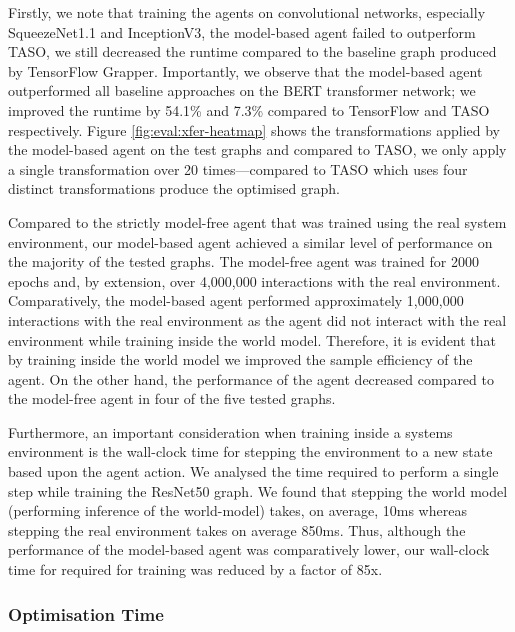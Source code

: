 Firstly, we note that training the agents on convolutional networks, especially SqueezeNet1.1 and InceptionV3, the model-based agent failed to outperform TASO, we still decreased the runtime compared to the baseline graph produced by TensorFlow Grapper. Importantly, we observe that the model-based agent outperformed all baseline approaches on the BERT transformer network; we improved the runtime by 54.1\% and 7.3\% compared to TensorFlow and TASO respectively. Figure \ref{fig:eval:xfer-heatmap} shows the transformations applied by the model-based agent on the test graphs and compared to TASO, we only apply a single transformation over 20 times---compared to TASO which uses four distinct transformations produce the optimised graph.


Compared to the strictly model-free agent that was trained using the real system environment, our model-based agent achieved a similar level of performance on the majority of the tested graphs. The model-free agent was trained for 2000 epochs and, by extension, over 4,000,000 interactions with the real environment. Comparatively, the model-based agent performed approximately 1,000,000 interactions with the real environment as the agent did not interact with the real environment while training inside the world model. Therefore, it is evident that by training inside the world model we improved the sample efficiency of the agent. On the other hand, the performance of the agent decreased compared to the model-free agent in four of the five tested graphs.

Furthermore, an important consideration when training inside a systems environment is the wall-clock time for stepping the environment to a new state based upon the agent action. We analysed the time required to perform a single step while training the ResNet50 graph. We found that stepping the world model (performing inference of the world-model) takes, on average, 10ms whereas stepping the real environment takes on average 850ms. Thus, although the performance of the model-based agent was comparatively lower, our wall-clock time for required for training was reduced by a factor of 85x.

\subsubsection{Optimisation Time}

